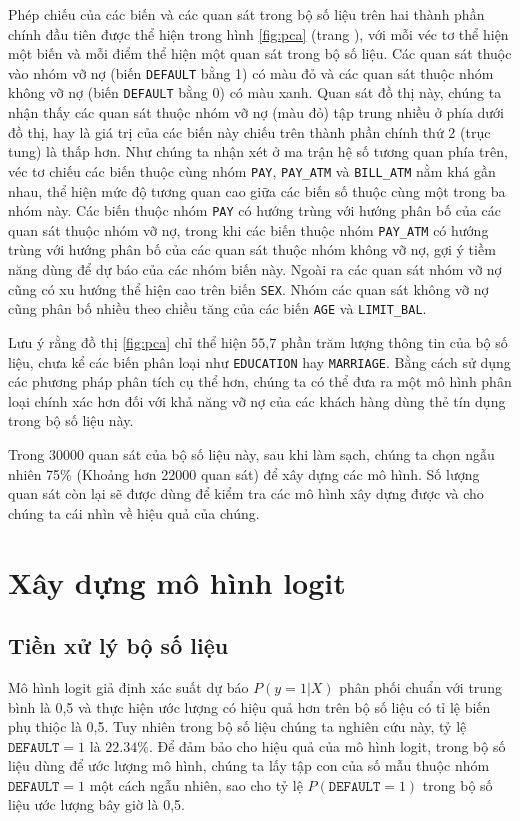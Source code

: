 \documentclass[a4paper]{report}\usepackage[]{graphicx}\usepackage[]{color}
\begin{document}
Phép chiếu của các biến và các quan sát trong bộ số liệu trên hai thành phần chính đầu tiên được thể hiện trong hình \ref{fig:pca} (trang \pageref{fig:pca}), với mỗi véc tơ thể hiện một biến và mỗi điểm thể hiện một quan sát trong bộ số liệu. Các quan sát thuộc vào nhóm vỡ nợ (biến \texttt{DEFAULT} bằng 1) có màu đỏ và các quan sát thuộc nhóm không vỡ nợ (biến \texttt{DEFAULT} bằng 0) có màu xanh. 
Quan sát đồ thị này, chúng ta nhận thấy các quan sát thuộc nhóm vỡ nợ (màu đỏ) tập trung nhiều ở phía dưới đồ thị, hay là giá trị của các biến này chiếu trên thành phần chính thứ 2 (trục tung) là thấp hơn. 
Như chúng ta nhận xét ở ma trận hệ số tương quan phía trên, véc tơ chiếu các biến thuộc cùng nhóm \texttt{PAY}, \texttt{PAY\_ATM} và \texttt{BILL\_ATM} nằm khá gần nhau, thể hiện mức độ tương quan cao giữa các biến số thuộc cùng một trong ba nhóm này. Các biến thuộc nhóm \texttt{PAY} có hướng trùng với hướng phân bố của các quan sát thuộc nhóm vỡ nợ, trong khi các biến thuộc nhóm \texttt{PAY\_ATM} có hướng trùng với hướng phân bố của các quan sát thuộc nhóm không vỡ nợ, gợi ý tiềm năng dùng để dự báo của các nhóm biến này. 
Ngoài ra các quan sát nhóm vỡ nợ cũng có xu hướng thể hiện cao trên biến 
\texttt{SEX}. Nhóm các quan sát không vỡ nợ cũng phân bố nhiều theo chiều tăng của các biến \texttt{AGE} và \texttt{LIMIT\_BAL}.

Lưu ý rằng đồ thị \ref{fig:pca} chỉ thể hiện $\text{55,7}$ phần trăm lượng thông tin của bộ số liệu, chưa kể các biến phân loại như \texttt{EDUCATION} hay \texttt{MARRIAGE}. Bằng cách sử dụng các phương pháp phân tích cụ thể hơn, chúng ta có thể đưa ra một mô hình phân loại chính xác hơn đối với khả năng vỡ nợ của các khách hàng dùng thẻ tín dụng trong bộ số liệu này.

Trong 30000 quan sát của bộ số liệu này, sau khi làm sạch, chúng ta chọn ngẫu nhiên 75\% (Khoảng hơn 22000 quan sát) để xây dựng các mô hình. Số lượng quan sát còn lại sẽ được dùng để kiểm tra các mô hình xây dựng được và cho chúng ta cái nhìn về hiệu quả của chúng.


\section{Xây dựng mô hình logit}

\subsection{Tiền xử lý bộ số liệu}
Mô hình logit giả định xác suất dự báo  $P(y = 1|X)$  phân phối chuẩn với trung bình là 0,5 và thực hiện ước lượng có hiệu quả hơn trên bộ số liệu có tỉ lệ biến phụ thiộc là 0,5. 
Tuy nhiên trong bộ số liệu chúng ta nghiên cứu này, tỷ lệ  $\texttt{DEFAULT} = 1$ là $22.34\%$.
Để đảm bảo cho hiệu quả của mô hình logit, trong bộ số liệu dùng để ước lượng mô hình, chúng ta lấy tập con của số mẫu thuộc nhóm $\texttt{DEFAULT} = 1$ một cách ngẫu nhiên, sao cho tỷ lệ  $P(\texttt{DEFAULT} = 1)$ trong bộ số liệu ước lượng bây giờ là 0,5. 
\end{document}
